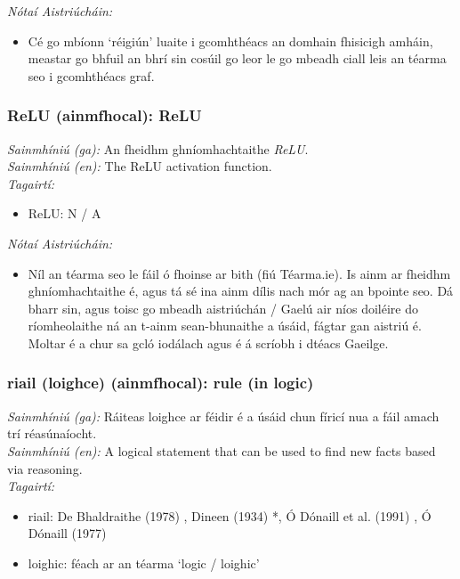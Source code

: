 \documentclass{article}
\begin{document}
 \noindent \textit{Nótaí Aistriúcháin:}
\begin{itemize}
	\item Cé go mbíonn `réigiún' luaite i gcomhthéacs an domhain fhisicigh amháin, meastar go bhfuil an bhrí sin cosúil go leor le go mbeadh ciall leis an téarma seo i gcomhthéacs graf.
\end{itemize}


\subsubsection*{ReLU (ainmfhocal): ReLU}
 \noindent \textit{Sainmhíniú (ga):} An fheidhm ghníomhachtaithe  \noindent \textit{ReLU}.
\\
 \noindent \textit{Sainmhíniú (en):} The ReLU activation function.
\\
 \noindent \textit{Tagairtí:}
\begin{itemize}
	\item ReLU: N / A
\end{itemize}

 \noindent \textit{Nótaí Aistriúcháin:}
\begin{itemize}
	\item Níl an téarma seo le fáil ó fhoinse ar bith (fiú Téarma.ie). Is ainm ar fheidhm ghníomhachtaithe é, agus tá sé ina ainm dílis nach mór ag an bpointe seo. Dá bharr sin, agus toisc go mbeadh aistriúchán / Gaelú air níos doiléire do ríomheolaithe ná an t-ainm sean-bhunaithe a úsáid, fágtar gan aistriú é. Moltar é a chur sa gcló iodálach agus é á scríobh i dtéacs Gaeilge.
\end{itemize}


\subsubsection*{riail (loighce) (ainmfhocal): rule (in logic)}
 \noindent \textit{Sainmhíniú (ga):} Ráiteas loighce ar féidir é a úsáid chun fíricí nua a fáil amach trí réasúnaíocht.
\\
 \noindent \textit{Sainmhíniú (en):} A logical statement that can be used to find new facts based via reasoning.
\\
 \noindent \textit{Tagairtí:}
\begin{itemize}
	\item riail: De Bhaldraithe (1978) \cite{de-bhaldraithe}, Dineen (1934) \cite{dineen}*, Ó Dónaill et al. (1991) \cite{focloir-beag}, Ó Dónaill (1977) \cite{odonaill}
	\item loighic: féach ar an téarma `logic / loighic'
\end{itemize}
\end{document}
